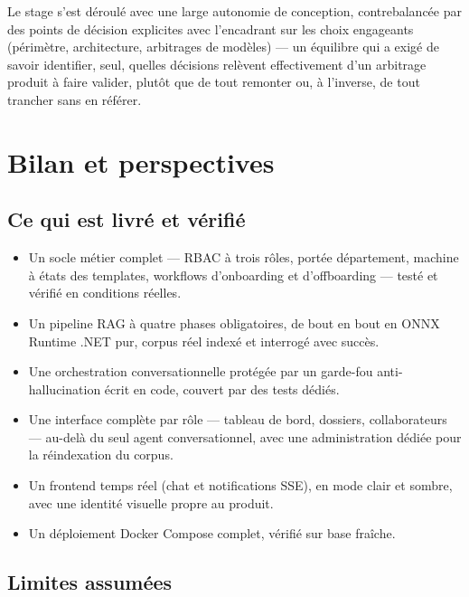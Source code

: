 \documentclass[12pt,a4paper]{article}
\begin{document}
Le stage s'est d\'eroul\'e avec une large autonomie de conception, contrebalanc\'ee par des points de d\'ecision explicites avec l'encadrant sur les choix engageants (p\'erim\`etre, architecture, arbitrages de mod\`eles) --- un \'equilibre qui a exig\'e de savoir identifier, seul, quelles d\'ecisions rel\`event effectivement d'un arbitrage produit \`a faire valider, plut\^ot que de tout remonter ou, \`a l'inverse, de tout trancher sans en r\'ef\'erer.

\newpage
\section{Bilan et perspectives}

\subsection{Ce qui est livr\'e et v\'erifi\'e}

\begin{itemize}
  \item Un socle m\'etier complet --- RBAC \`a trois r\^oles, portée d\'epartement, machine \`a \'etats des templates, workflows d'onboarding et d'offboarding --- test\'e et v\'erifi\'e en conditions r\'eelles.
  \item Un pipeline RAG \`a quatre phases obligatoires, de bout en bout en ONNX Runtime .NET pur, corpus r\'eel index\'e et interrog\'e avec succ\`es.
  \item Une orchestration conversationnelle prot\'eg\'ee par un garde-fou anti-hallucination \'ecrit en code, couvert par des tests d\'edi\'es.
  \item Une interface compl\`ete par r\^ole --- tableau de bord, dossiers, collaborateurs --- au-del\`a du seul agent conversationnel, avec une administration d\'edi\'ee pour la r\'eindexation du corpus.
  \item Un frontend temps r\'eel (chat et notifications SSE), en mode clair et sombre, avec une identit\'e visuelle propre au produit.
  \item Un d\'eploiement Docker Compose complet, v\'erifi\'e sur base fra\^iche.
\end{itemize}

\subsection{Limites assum\'ees}
\end{document}
